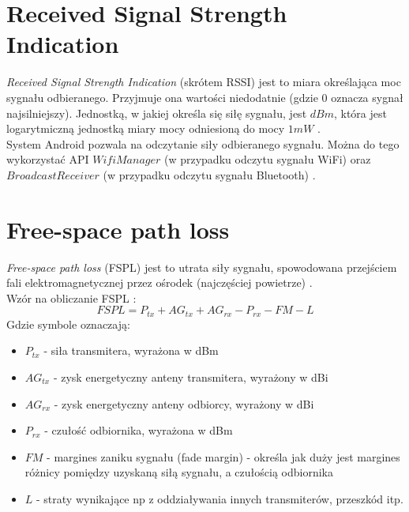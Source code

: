 \section{Received Signal Strength Indication}
\textit{Received Signal Strength Indication} (skrótem RSSI) jest to miara określająca moc sygnału odbieranego. Przyjmuje ona wartości niedodatnie (gdzie 0 oznacza sygnał najsilniejszy). Jednostką, w jakiej określa się siłę sygnału, jest $dBm$, która jest logarytmiczną jednostką miary mocy odniesioną do mocy $1mW$ \cite{AMMC}.\\
System Android pozwala na odczytanie siły odbieranego sygnału. Można do tego wykorzystać API $WifiManager$ (w przypadku odczytu sygnału WiFi) oraz $BroadcastReceiver$ (w przypadku odczytu sygnału Bluetooth) \cite{ADBR}.
\section{Free-space path loss}		  		  
\textit{Free-space path loss} (FSPL) jest to utrata siły sygnału, spowodowana przejściem fali elektromagnetycznej przez ośrodek (najczęściej powietrze) \cite{SPPLM}.\\
Wzór na obliczanie FSPL \cite{TPL}:
\begin{equation}
FSPL = P_{tx} + AG_{tx} + AG_{rx} - P_{rx} - FM - L
\end{equation}
Gdzie symbole oznaczają:
\begin{itemize}
	\item $P_{tx}$ - siła transmitera, wyrażona w dBm
	\item $AG_{tx}$ - zysk energetyczny anteny transmitera, wyrażony w dBi
	\item $AG_{rx}$ - zysk energetyczny anteny odbiorcy, wyrażony w dBi
	\item $P_{rx}$ - czułość odbiornika, wyrażona w dBm
	\item $FM$ - margines zaniku sygnału (fade margin) - określa jak duży jest margines różnicy pomiędzy uzyskaną siłą sygnału, a czułością odbiornika
	\item $L$ - straty wynikające np z oddziaływania innych transmiterów, przeszkód itp.
\end{itemize}
